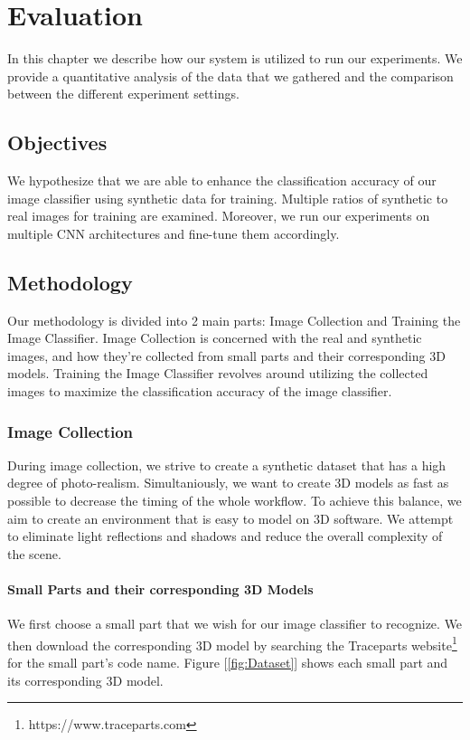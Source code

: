 \chapter{Evaluation}\label{ch:evaluation}

In this chapter we describe how our system is utilized to run our experiments. We provide a quantitative analysis of the data that we gathered and the comparison between the different experiment settings.

\section{Objectives}

We hypothesize that we are able to enhance the classification accuracy of our image classifier using synthetic data for training. Multiple ratios of synthetic to real images for training are examined. Moreover, we run our experiments on multiple CNN architectures and fine-tune them accordingly.


\section{Methodology}

Our methodology is divided into 2 main parts: Image Collection and Training the Image Classifier. Image Collection is concerned with the real and synthetic images, and how they're collected from small parts and their corresponding 3D models. Training the Image Classifier revolves around utilizing the collected images to maximize the classification accuracy of the image classifier.

\subsection{Image Collection}

During image collection, we strive to create a synthetic dataset that has a high degree of photo-realism. Simultaniously, we want to create 3D models as fast as possible to decrease the timing of the whole workflow. To achieve this balance, we aim to create an environment that is easy to model on 3D software. We attempt to eliminate light reflections and shadows and reduce the overall complexity of the scene.

\subsubsection{Small Parts and their corresponding 3D Models}
We first choose a small part that we wish for our image classifier to recognize. We then download the corresponding 3D model by searching the Traceparts website\footnote{https://www.traceparts.com} for the small part's code name. Figure [\ref{fig:Dataset}] shows each small part and its corresponding 3D model. 



